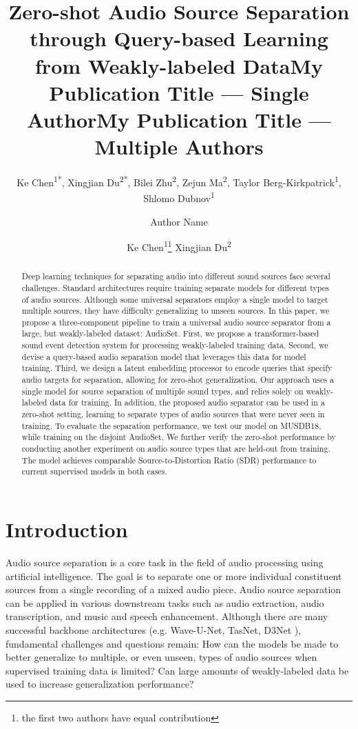 \documentclass[letterpaper]{article} \usepackage{aaai22}  \usepackage{times}  \usepackage{helvet}  \usepackage{courier}  \usepackage[hyphens]{url}  \usepackage{graphicx} \urlstyle{rm} \def\UrlFont{\rm}  \usepackage{natbib}  \usepackage{caption} \DeclareCaptionStyle{ruled}{labelfont=normalfont,labelsep=colon,strut=off} \frenchspacing  \setlength{\pdfpagewidth}{8.5in}  \setlength{\pdfpageheight}{11in}  \usepackage{algorithm}
\title{Zero-shot Audio Source Separation through Query-based Learning \\ from Weakly-labeled Data}
\author {
Ke Chen\textsuperscript{1*}\blfootnote{The first two authors have equal contribution, and this work was performed while Ke Chen interned at Bytedance.}, 
    Xingjian Du\textsuperscript{2*},
    Bilei Zhu\textsuperscript{2},
    Zejun Ma\textsuperscript{2},
    Taylor Berg-Kirkpatrick\textsuperscript{1},
    Shlomo Dubnov\textsuperscript{1}
}
\title{My Publication Title --- Single Author}
\author {
    Author Name
}
\title{My Publication Title --- Multiple Authors}
\author {
Ke Chen\textsuperscript{\rm 1}\thanks{the first two authors have equal contribution}
    Xingjian Du\textsuperscript{\rm 2}
}
\begin{document}
\maketitle
\begin{abstract}
Deep learning techniques for separating audio into different sound sources face several challenges. Standard architectures require training separate models for different types of audio sources. Although some universal separators employ a single model to target multiple sources, they have difficulty generalizing to unseen sources. In this paper, we propose a three-component pipeline to train a universal audio source separator from a large, but weakly-labeled dataset: AudioSet. First, we propose a transformer-based sound event detection system for processing weakly-labeled training data. Second, we devise a query-based audio separation model that leverages this data for model training. Third, we design a latent embedding processor to encode queries that specify audio targets for separation, allowing for zero-shot generalization. Our approach uses a single model for source separation of multiple sound types, and relies solely on weakly-labeled data for training. In addition, the proposed audio separator can be used in a zero-shot setting, learning to separate types of audio sources that were never seen in training. To evaluate the separation performance, we test our model on MUSDB18, while training on the disjoint AudioSet. We further verify the zero-shot performance by conducting another experiment on audio source types that are held-out from training. The model achieves comparable Source-to-Distortion Ratio (SDR) performance to current supervised models in both cases.
\end{abstract}

\section{Introduction}
Audio source separation is a core task in the field of audio processing using artificial intelligence. The goal is to separate one or more individual constituent sources from a single recording of a mixed audio piece. Audio source separation can be applied in various downstream tasks such as audio extraction, audio transcription, and music and speech enhancement. Although there are many successful backbone architectures (e.g. Wave-U-Net, TasNet, D3Net \cite{wavunet, tasnet, d3net}), fundamental challenges and questions remain: How can the models be made to better generalize to multiple, or even unseen, types of audio sources when supervised training data is limited? Can large amounts of weakly-labeled data be used to increase generalization performance?
\end{document}
